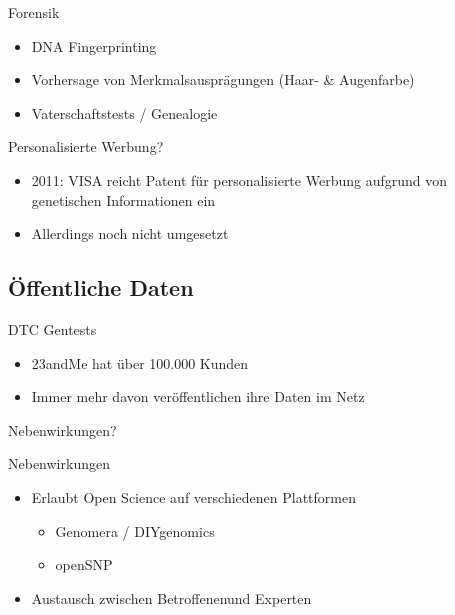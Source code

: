 \documentclass[12pt,a4paper]{beamer}
\begin{document}
\begin{frame}{Forensik}
	\begin{itemize}
		\item DNA Fingerprinting
		\pause \item Vorhersage von Merkmalsausprägungen (Haar- \& Augenfarbe) 
		\pause \item Vaterschaftstests / Genealogie
	\end{itemize}
\end{frame}

\begin{frame}{Personalisierte Werbung?}
	\begin{itemize}
		\item 2011: VISA reicht Patent für personalisierte Werbung aufgrund von genetischen Informationen ein
		\pause \item Allerdings noch nicht umgesetzt
	\end{itemize}
\end{frame}

\subsection{Öffentliche Daten} 

\begin{frame}{DTC Gentests}
	\begin{itemize}
		\item 23andMe hat über 100.000 Kunden
		\pause \item Immer mehr davon veröffentlichen ihre Daten im Netz
	\end{itemize}
	\begin{center}
		Nebenwirkungen?
	\end{center}
\end{frame}

\begin{frame}{Nebenwirkungen}	
	\begin{itemize}
		\item Erlaubt Open Science auf verschiedenen Plattformen
		\begin{itemize}
			\item Genomera / DIYgenomics
			\item openSNP
		\end{itemize}
		\pause \item Austausch zwischen \glqq Betroffenen\grqq und \glqq Experten\grqq
	\end{itemize}
\end{frame}
\end{document}
